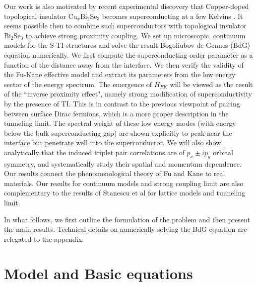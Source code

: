 \documentclass[11pt]{report}
\begin{document}
Our work is also motivated by recent experimental discovery that Copper-doped 
topological insulator Cu$_x$Bi$_2$Se$_3$
becomes superconducting at a few Kelvins \cite{cu1,cu2,ando}. It 
seems possible then to combine such superconductors with topological insulator 
Bi$_2$Se$_3$ to achieve strong proximity coupling. 
We set up microscopic, continuum models for the S-TI structures and solve the result 
Bogoliubov-de Gennes (BdG) equation numerically.
We first compute the superconducting order 
parameter as a function of the distance
away from the interface.
We then verify the validity of the Fu-Kane effective model
and extract its parameters from the low energy sector of the energy
spectrum. The emergence
of $H_{FK}$ will be viewed as the result of the ``inverse proximity effect", namely
strong modification of superconductivity by the presence of TI.
This is in contrast to the previous viewpoint of
pairing between surface Dirac fermions, which is a more proper description
in the tunneling limit.
The spectral weight of these low energy modes (with energy below the bulk superconducting gap) 
are shown explicitly to peak near the interface but penetrate well
into the superconductor.
We will also show analytically that the induced triplet pair
correlations are of $p_x\pm ip_y$ orbital symmetry, and systematically
study their spatial and momentum dependence.
Our results connect the phenomenological theory of Fu and Kane \cite{f-k}
to real materials. Our results for continuum models and strong coupling 
limit are also complementary to the results of Stanescu et al \cite{stan}
for lattice models and tunneling limit.

In what follows, we first outline the formulation of the problem and 
then present the main results. Technical details on numerically solving
the BdG equation are relegated to the appendix.

\section{Model and Basic equations}
\end{document}
